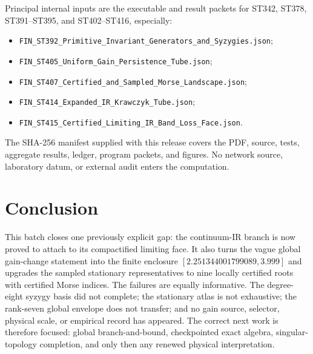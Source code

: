 \documentclass[11pt,a4paper]{article}
\begin{document}
Principal internal inputs are the executable and result packets for ST342,
ST378, ST391--ST395, and ST402--ST416, especially:
\begin{itemize}[leftmargin=1.5em]
\item \texttt{FIN\_ST392\_Primitive\_Invariant\_Generators\_and\_Syzygies.json};
\item \texttt{FIN\_ST405\_Uniform\_Gain\_Persistence\_Tube.json};
\item \texttt{FIN\_ST407\_Certified\_and\_Sampled\_Morse\_Landscape.json};
\item \texttt{FIN\_ST414\_Expanded\_IR\_Krawczyk\_Tube.json};
\item \texttt{FIN\_ST415\_Certified\_Limiting\_IR\_Band\_Loss\_Face.json}.
\end{itemize}
The SHA-256 manifest supplied with this release covers the PDF, source, tests,
aggregate results, ledger, program packets, and figures.  No network source,
laboratory datum, or external audit enters the computation.

\section{Conclusion}

This batch closes one previously explicit gap: the continuum-IR branch is now
proved to attach to its compactified limiting face.  It also turns the vague
global gain-change statement into the finite enclosure
$[2.251344001799089,3.999]$ and upgrades the sampled stationary representatives
to nine locally certified roots with certified Morse indices.  The failures are
equally informative.  The degree-eight syzygy basis did not complete; the
stationary atlas is not exhaustive; the rank-seven global envelope does not
transfer; and no gain source, selector, physical scale, or empirical record has
appeared.  The correct next work is therefore focused: global branch-and-bound,
checkpointed exact algebra, singular-topology completion, and only then any
renewed physical interpretation.
\end{document}
